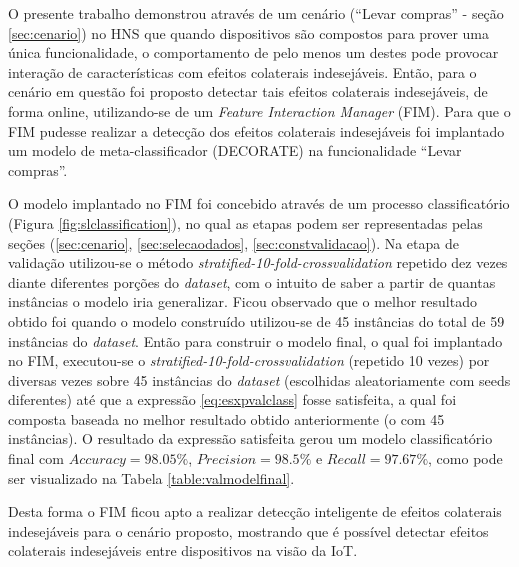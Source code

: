 O presente trabalho demonstrou através de um cenário (``Levar compras'' - seção \ref{sec:cenario}) no HNS que quando dispositivos são compostos para prover uma única funcionalidade, o comportamento de pelo menos um destes pode provocar interação de características com efeitos colaterais indesejáveis. Então, para o cenário em questão foi proposto detectar tais efeitos colaterais indesejáveis, de forma online, utilizando-se de um \textit{Feature Interaction Manager} (FIM). Para que o FIM pudesse realizar a detecção dos efeitos colaterais indesejáveis foi implantado um modelo de meta-classificador (DECORATE) na funcionalidade ``Levar compras''.

O modelo implantado no FIM foi concebido através de um processo classificatório (Figura \ref{fig:slclassification}), no qual as etapas podem ser representadas pelas seções (\ref{sec:cenario}, \ref{sec:selecaodados}, \ref{sec:constvalidacao}). Na etapa de validação utilizou-se o método \textit{stratified-10-fold-crossvalidation} repetido dez vezes diante diferentes porções do \textit{dataset}, com o intuito de saber a partir de quantas instâncias o modelo iria generalizar. Ficou observado que o melhor resultado obtido foi quando o modelo construído utilizou-se de 45 instâncias do total de 59 instâncias do \textit{dataset}. Então para construir o modelo final, o qual foi  implantado no FIM, executou-se o \textit{stratified-10-fold-crossvalidation} (repetido 10 vezes) por diversas vezes sobre 45 instâncias do \textit{dataset} (escolhidas aleatoriamente com seeds diferentes) até que a expressão \ref{eq:esxpvalclass} fosse satisfeita, a qual foi composta baseada no melhor resultado obtido anteriormente (o com 45 instâncias). O resultado da expressão satisfeita gerou um modelo classificatório final com $\textit{Accuracy}=98.05\%$, $\textit{Precision}=98.5\%$ e $\textit{Recall}=97.67\%$, como pode ser visualizado na Tabela \ref{table:valmodelfinal}.

Desta forma o FIM ficou apto a realizar detecção inteligente de efeitos colaterais indesejáveis para o cenário proposto, mostrando que é possível detectar efeitos colaterais indesejáveis entre dispositivos na visão da IoT.
